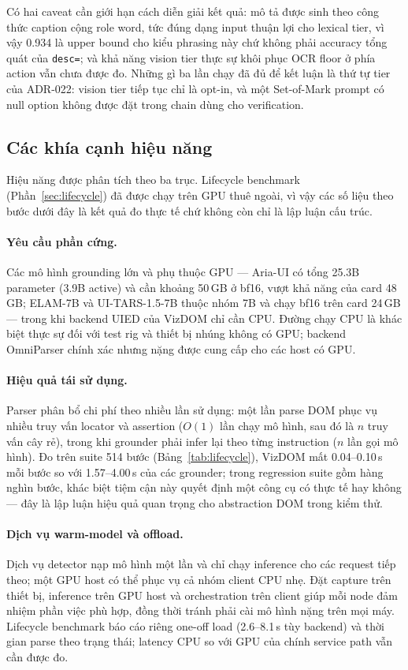 \documentclass[11pt,a4paper]{article}
\newcommand{\code}[1]{\texttt{#1}}
\begin{document}
Có hai caveat cần giới hạn cách diễn giải kết quả: mô tả được sinh theo công thức
caption cộng role word, tức đúng dạng input thuận lợi cho lexical tier, vì vậy 0.934 là
upper bound cho kiểu phrasing này chứ không phải accuracy tổng quát của \code{desc=};
và khả năng vision tier thực sự khôi phục OCR floor ở phía action vẫn chưa được đo.
Những gì ba lần chạy đã đủ để kết luận là thứ tự tier của ADR-022: vision tier tiếp tục
chỉ là opt-in, và một Set-of-Mark prompt có null option không được đặt trong chain dùng
cho verification.

\subsection{Các khía cạnh hiệu năng}
Hiệu năng được phân tích theo ba trục. Lifecycle benchmark
(Phần~\ref{sec:lifecycle}) đã được chạy trên GPU thuê ngoài, vì vậy các số liệu theo
bước dưới đây là kết quả đo thực tế chứ không còn chỉ là lập luận cấu trúc.

\paragraph{Yêu cầu phần cứng.} Các mô hình grounding lớn và phụ thuộc GPU ---
Aria-UI có tổng 25.3B parameter (3.9B active) và cần khoảng 50\,GB ở bf16, vượt khả
năng của card 48\,GB; ELAM-7B và UI-TARS-1.5-7B thuộc nhóm 7B và chạy bf16 trên card
24\,GB --- trong khi backend UIED của VizDOM chỉ cần CPU. Đường chạy CPU là khác biệt
thực sự đối với test rig và thiết bị nhúng không có GPU; backend OmniParser chính xác
nhưng nặng được cung cấp cho các host có GPU.

\paragraph{Hiệu quả tái sử dụng.} Parser phân bổ chi phí theo nhiều lần sử dụng: một
lần parse DOM phục vụ nhiều truy vấn locator và assertion ($O(1)$ lần chạy mô hình,
sau đó là $n$ truy vấn cây rẻ), trong khi grounder phải infer lại theo từng
instruction ($n$ lần gọi mô hình). Đo trên suite 514 bước
(Bảng~\ref{tab:lifecycle}), VizDOM mất 0.04--0.10\,s mỗi bước so với 1.57--4.00\,s
của các grounder; trong regression suite gồm hàng nghìn bước, khác biệt tiệm cận này
quyết định một công cụ có thực tế hay không --- đây là lập luận hiệu quả quan trọng
cho abstraction DOM trong kiểm thử.

\paragraph{Dịch vụ warm-model và offload.} Dịch vụ detector nạp mô hình một lần và
chỉ chạy inference cho các request tiếp theo; một GPU host có thể phục vụ cả nhóm
client CPU nhẹ. Đặt capture trên thiết bị, inference trên GPU host và orchestration
trên client giúp mỗi node đảm nhiệm phần việc phù hợp, đồng thời tránh phải cài mô
hình nặng trên mọi máy. Lifecycle benchmark báo cáo riêng one-off load
(2.6--8.1\,s tùy backend) và thời gian parse theo trạng thái; latency CPU so với GPU
của chính service path vẫn cần được đo.
\end{document}
